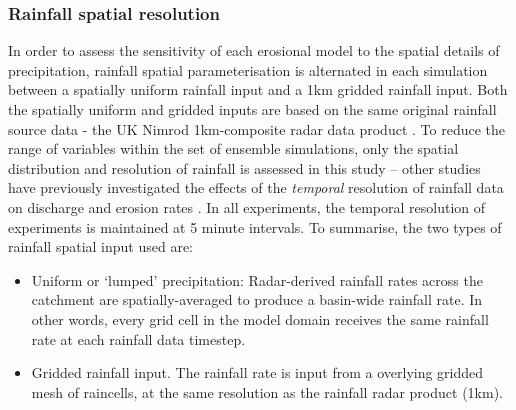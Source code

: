 \subsubsection{Rainfall spatial resolution}
In order to assess the sensitivity of each erosional model to the spatial details of precipitation, rainfall spatial parameterisation is alternated in each simulation between a spatially uniform rainfall input and a 1km gridded rainfall input. Both the spatially uniform and gridded inputs are based on the same original rainfall source data - the UK Nimrod 1km-composite radar data product \citep{metoffice2003nimrod}. To reduce the range of variables within the set of ensemble simulations, only the spatial distribution and resolution of rainfall is assessed in this study -- other studies have previously investigated the effects of the \textit{temporal} resolution of rainfall data on discharge and erosion rates \citep{nicotina2008impact,Coulthard2013,coulthard2016sensitivity}. In all experiments, the temporal resolution of experiments is maintained at 5 minute intervals. To summarise, the two types of rainfall spatial input used are: 

\begin{itemize}
\item Uniform or `lumped' precipitation: Radar-derived rainfall rates across the catchment are spatially-averaged to produce a basin-wide rainfall rate. In other words, every grid cell in the model domain receives the same rainfall rate at each rainfall data timestep.
\item Gridded rainfall input. The rainfall rate is input from a overlying gridded mesh of raincells, at the same resolution as the rainfall radar product (1km).
\end{itemize}



%

